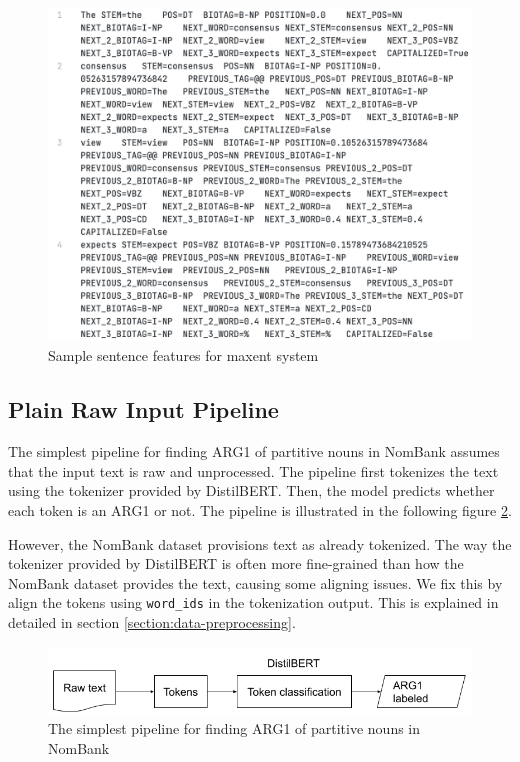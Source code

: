 \documentclass[11pt]{article}
\begin{document}
\begin{figure}[h]
  \centering
  \includegraphics[width=\linewidth]{assets/maxent-feature-sample.png}
  \caption{Sample sentence features for maxent system}
  \label{fig:maxent-feature-sample}
\end{figure}

\subsection{Plain Raw Input Pipeline}
\label{section:plain-pipeline}

The simplest pipeline for finding ARG1 of partitive nouns in NomBank assumes that the input text is raw and unprocessed. The pipeline first tokenizes the text using the tokenizer provided by DistilBERT. Then, the model predicts whether each token is an ARG1 or not. The pipeline is illustrated in the following figure \ref{fig:simplest-arg1-pipeline}.

However, the NomBank dataset provisions text as already tokenized. The way the tokenizer provided by DistilBERT is often more fine-grained than how the NomBank dataset provides the text, causing some aligning issues. We fix this by align the tokens using \verb|word_ids| in the tokenization output. This is explained in detailed in section \ref{section:data-preprocessing}.

\begin{figure}[h]
  \centering
  \includegraphics[width=\linewidth]{assets/simplest-arg1-pipeline.png}
  \caption{The simplest pipeline for finding ARG1 of partitive nouns in NomBank}
  \label{fig:simplest-arg1-pipeline}
\end{figure}
\end{document}
